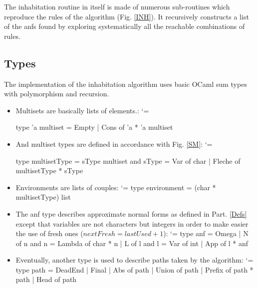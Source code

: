\documentclass{article}
\let\origlstlisting=\lstlisting
\let\endoriglstlisting=\endlstlisting
\renewenvironment{lstlisting}
{\mathcode`\-=\hyphenmathcode
    \everymath{}\mathsurround=0pt\origlstlisting}
{\endoriglstlisting}
\begin{document}
The inhabitation routine in itself  is made of numerous sub-routines which reproduce the rules of the algorithm (Fig. \ref{INH}). It recursively constructs a list of the anfs found by exploring systematically all the reachable combinations of rules.

\subsection{Types}
The implementation of the inhabitation algorithm uses basic OCaml sum types with polymorphism and recursion. 

\begin{itemize}
    \item Multisets are basically lists of elements.:
    \begin{lstlisting} %[caption={Multisets}]
    
    type 'a multiset =
      Empty
      | Cons of 'a * 'a multiset
    \end{lstlisting}
    
    \item And multiset types are defined in accordance with Fig. \ref{SM}:
    \begin{lstlisting} %[caption={Intersection types and environments}]
    
    type multisetType = 
      sType multiset
    and sType = 
      Var of char
      | Fleche of multisetType * sType
    \end{lstlisting}
    
    \item Environments are lists of couples:
    \begin{lstlisting}
    type environment = (char * multisetType) list
    \end{lstlisting}
    
    \item The anf type describes approximate normal forms as defined in Part. \ref{Defs} except that variables are not characters but integers in order to make easier the use of fresh ones ($nextFresh = lastUsed + 1$):
    \begin{lstlisting}[caption={Approximate normal forms}]
    type anf = 
      Omega
      | N of n
    and n = 
      Lambda of char * n
      | L of l
    and l =
      Var of int
      | App of l * anf
    \end{lstlisting}
    
    \item Eventually, another type is used to describe paths taken by the algorithm:
    \begin{lstlisting}
    type path = 
      DeadEnd
      | Final
      | Abs of path
      | Union of path
      | Prefix of path * path
      | Head of path
    \end{lstlisting}
\end{itemize}
\end{document}
